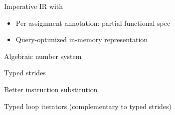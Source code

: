 \newpage
{}

{\LARGE

Imperative IR with
\begin{itemize}
  \item Per-assignment annotation: partial functional spec
  \item Query-optimized in-memory representation
\end{itemize}

Algebraic number system  %

Typed strides

Better instruction substitution

Typed loop iterators (complementary to typed strides)

}


